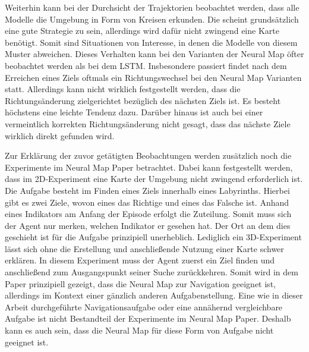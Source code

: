 Weiterhin kann bei der Durchsicht der Trajektorien beobachtet werden, dass alle Modelle die Umgebung in Form von Kreisen erkunden. Die scheint grundsätzlich eine gute Strategie zu sein, allerdings wird dafür nicht zwingend eine Karte benötigt. Somit sind Situationen von Interesse, in denen die Modelle von diesem Muster abweichen. Dieses Verhalten kann bei den Varianten der Neural Map öfter beobachtet werden als bei dem LSTM. Insbesondere passiert findet nach dem Erreichen eines Ziels oftmals ein Richtungswechsel bei den Neural Map Varianten statt. Allerdings kann nicht wirklich festgestellt werden, dass die Richtungsänderung zielgerichtet bezüglich des nächsten Ziels ist. Es besteht höchstens eine leichte Tendenz dazu. Darüber hinaus ist auch bei einer vermeintlich korrekten Richtungsänderung nicht gesagt, dass das nächste Ziele wirklich direkt gefunden wird.

Zur Erklärung der zuvor getätigten Beobachtungen werden zusätzlich noch die Experimente im Neural Map Paper betrachtet. Dabei kann festgestellt werden, dass im 2D-Experiment eine Karte der Umgebung nicht zwingend erforderlich ist. Die Aufgabe besteht im Finden eines Ziels innerhalb eines Labyrinths. Hierbei gibt es zwei Ziele, wovon eines das Richtige und eines das Falsche ist. Anhand eines Indikators am Anfang der Episode erfolgt die Zuteilung. Somit muss sich der Agent nur merken, welchen Indikator er gesehen hat. Der Ort an dem dies geschieht ist für die Aufgabe prinzipiell unerheblich. Lediglich ein 3D-Experiment lässt sich ohne die Erstellung und anschließende Nutzung einer Karte schwer erklären. In diesem Experiment muss der Agent zuerst ein Ziel finden und anschließend zum Ausgangspunkt seiner Suche zurückkehren. Somit wird in dem Paper prinzipiell gezeigt, dass die Neural Map zur Navigation geeignet ist, allerdings im Kontext einer gänzlich anderen Aufgabenstellung. Eine wie in dieser Arbeit durchgeführte Navigationsaufgabe oder eine annähernd vergleichbare Aufgabe ist nicht Bestandteil der Experimente im Neural Map Paper. Deshalb kann es auch sein, dass die Neural Map für diese Form von Aufgabe nicht geeignet ist.

